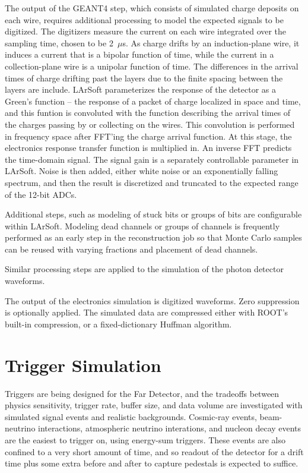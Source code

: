 The output of the GEANT4 step, which consists of simulated charge deposits on each wire, requires
additional processing to model the expected signals to be digitized.  The digitizers measure the
current on each wire integrated over the sampling time, chosen to be 2~$\mu$s.  As charge drifts
by an induction-plane wire, it induces a current that is a bipolar function of time, while the
current in a collection-plane wire is a unipolar function of time.  The differences in the arrival
times of charge drifting past the layers due to the finite spacing between the layers are include.
LArSoft parameterizes the response
of the detector as a Green's function -- the response of a packet of charge localized in space and time,
and this funtion is convoluted with the function describing the arrival times of the charges passing by
or collecting on the wires.  This convolution is performed in frequency space after FFT'ing the charge
arrival function.  At this stage, the electronics response transfer function is multiplied in.  An inverse
FFT predicts the time-domain signal.  The signal gain is a separately controllable parameter in LArSoft.
  Noise is then added, either white noise or an exponentially falling
spectrum, and then the result is discretized and truncated to the expected range of the 12-bit ADCs.  

Additional steps, such as modeling of stuck bits or groups of bits are configurable within LArSoft.
Modeling dead channels or groups of channels is frequently performed as an early step
in the reconstruction job so that Monte Carlo samples can be reused with varying fractions and placement
of dead channels.

Similar processing steps are applied to the simulation of the photon detector waveforms.

The output of the electronics simulation is digitized waveforms.  Zero suppression is optionally
applied.  The simulated data are compressed either with ROOT's built-in compression, or a fixed-dictionary
Huffman algorithm.

\section{Trigger Simulation}

Triggers are being designed for the Far Detector, and the tradeoffs between physics sensitivity,
trigger rate, buffer size, and data volume are investigated with simulated signal events and
realistic backgrounds.  Cosmic-ray events, beam-neutrino interactions, atmospheric neutrino interations,
and nucleon decay events are the easiest to trigger on, using energy-sum triggers.  These events
are also confined to a very short amount of time, and so readout of the detector for a drift time plus some
extra before and after to capture pedestals is expected to suffice.
 
